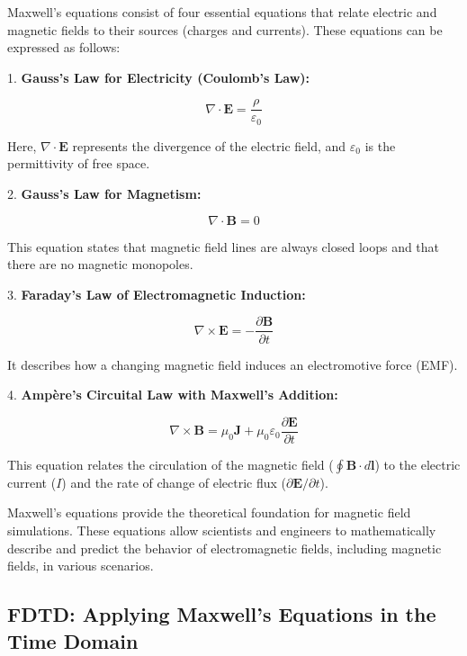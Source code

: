 \documentclass[11pt, a4paper, titlepage]{article}
\begin{document}
Maxwell's equations consist of four essential equations that relate electric and magnetic fields to their sources (charges and currents). These equations can be expressed as follows:
\begin{center}
	1. \textbf{Gauss's Law for Electricity (Coulomb's Law):}
	
	\[
	\nabla \cdot \mathbf{E} = \frac{\rho}{\varepsilon_0}
	\]
	
	Here, \(\nabla \cdot \mathbf{E}\) represents the divergence of the electric field, and \(\varepsilon_0\) is the permittivity of free space.
\end{center}
\begin{center}
	2. \textbf{Gauss's Law for Magnetism:}
	
	\[
	\nabla \cdot \mathbf{B} = 0
	\]
	
	This equation states that magnetic field lines are always closed loops and that there are no magnetic monopoles.
\end{center}
\begin{center}
	3. \textbf{Faraday's Law of Electromagnetic Induction:}
	
	\[
	\nabla \times \mathbf{E} = -\frac{\partial \mathbf{B}}{\partial t}
	\]
	
	It describes how a changing magnetic field induces an electromotive force (EMF).
\end{center}
\begin{center}
	4. \textbf{Ampère's Circuital Law with Maxwell's Addition:}
	
	\[
	\nabla \times \mathbf{B} = \mu_0 \mathbf{J} + \mu_0 \varepsilon_0 \frac{\partial \mathbf{E}}{\partial t}
	\]
	
	This equation relates the circulation of the magnetic field (\(\oint \mathbf{B} \cdot d\mathbf{l}\)) to the electric current (\(I\)) and the rate of change of electric flux (\(\partial \mathbf{E}/\partial t\)). 
\end{center}

Maxwell's equations provide the theoretical foundation for magnetic field simulations. These equations allow scientists and engineers to mathematically describe and predict the behavior of electromagnetic fields, including magnetic fields, in various scenarios. 

\newpage
\subsection{FDTD: Applying Maxwell's Equations in the Time Domain}
\end{document}
